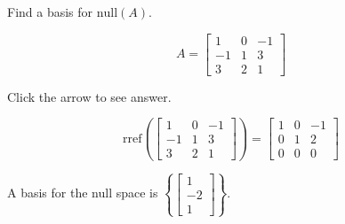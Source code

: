 \documentclass{ximera}
\begin{document}
\begin{problem}\label{prb:5.38a} Find a basis for $\mbox{null} \left(A \right)$.

$$A = \left[ \begin{array}{rrr}
1 & 0 & -1 \\
-1 & 1 & 3 \\
3 & 2 & 1
\end{array} \right]$$

Click the arrow to see answer.

\begin{expandable}
    $$\text{rref}\left(\left[ \begin{array}{rrr}
1 & 0 & -1 \\
-1 & 1 & 3 \\
3 & 2 & 1
\end{array} \right]\right)=\begin{bmatrix}
    1& 0& -1\\
 0 &1& 2\\
 0& 0& 0
\end{bmatrix}$$

A basis for the null space is $\left\{\begin{bmatrix}
     1\\-2\\1
 \end{bmatrix}\right\}$.
\end{expandable}
\end{problem}
\end{document}
